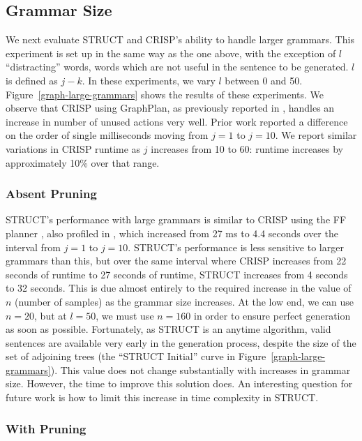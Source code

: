 \subsection{Grammar Size}
We next evaluate STRUCT and CRISP's ability to
handle larger grammars. This experiment is set up in the same way as
the one above, with the exception of $l$ ``distracting'' words, words
which are not useful in the sentence to be generated.  $l$ is defined
as $j - k$.  In these experiments, we vary $l$ between 0 and 50.
Figure~\ref{graph-large-grammars} shows the results of these
experiments.  We observe that CRISP using GraphPlan, as previously
reported in \cite{koller_experiences_2011}, handles an increase in
number of unused actions very well.  Prior work reported a difference
on the order of single milliseconds moving from $j = 1$ to $j = 10$.
We report similar variations in CRISP runtime as $j$ increases from 10
to 60: runtime increases by approximately 10\% over that range.

\subsubsection{Absent Pruning}

STRUCT's performance with large grammars is similar to CRISP using the
FF planner \cite{hoffmann_ff_2001}, also profiled in
\cite{koller_experiences_2011}, which increased from 27 ms to 4.4
seconds over the interval from $j = 1$ to $j = 10$.  STRUCT's
performance is less sensitive to larger grammars than this, but over
the same interval where CRISP increases from 22 seconds of runtime to
27 seconds of runtime, STRUCT increases from 4 seconds to 32 seconds.
This is due almost entirely to the required increase in the value of
$n$ (number of samples) as the grammar size increases.  At the low
end, we can use $n=20$, but at $l = 50$, we must use $n = 160$ in
order to ensure perfect generation as soon as possible.  Fortunately,
as STRUCT is an anytime algorithm, valid sentences are available very
early in the generation process, despite the size of the set of
adjoining trees (the ``STRUCT Initial'' curve in
Figure~\ref{graph-large-grammars}).  This value does not change
substantially with increases in grammar size.  However, the time to
improve this solution does. An interesting question for future work is
how to limit this increase in time complexity in STRUCT. 

\subsubsection{With Pruning}

